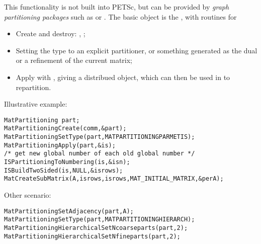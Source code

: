 This functionality is not built into PETSc, but can be provided by
\emph{graph partitioning packages}
such as  or .
The basic object is the ,
with routines for 
\begin{itemize}
\item Create and destroy: ,
  ;
\item Setting the type 
  to an explicit partitioner, or something generated
  as the dual or a refinement of the current matrix;
\item Apply with ,
  giving a distribued  object,
  which can then be used in 
  to repartition.
\end{itemize}
Illustrative example:
\begin{lstlisting}
MatPartitioning part;
MatPartitioningCreate(comm,&part);
MatPartitioningSetType(part,MATPARTITIONINGPARMETIS);
MatPartitioningApply(part,&is);
/* get new global number of each old global number */
ISPartitioningToNumbering(is,&isn);
ISBuildTwoSided(is,NULL,&isrows);
MatCreateSubMatrix(A,isrows,isrows,MAT_INITIAL_MATRIX,&perA);
\end{lstlisting}

Other scenario:
\begin{lstlisting}
MatPartitioningSetAdjacency(part,A);
MatPartitioningSetType(part,MATPARTITIONINGHIERARCH);
MatPartitioningHierarchicalSetNcoarseparts(part,2);
MatPartitioningHierarchicalSetNfineparts(part,2);
\end{lstlisting}
